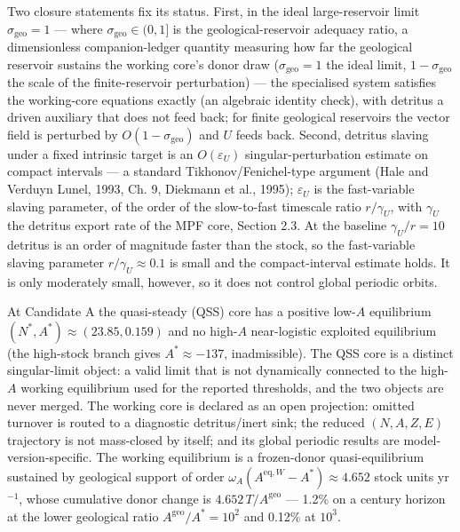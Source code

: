 \documentclass[11pt]{article}
\begin{document}
Two closure statements fix its status. First, in the ideal
large-reservoir limit \(\sigma_{\mathrm{geo}} = 1\) --- where
\(\sigma_{\mathrm{geo}} \in (0,1]\) is the geological-reservoir adequacy
ratio, a dimensionless companion-ledger quantity measuring how far the
geological reservoir sustains the working core's donor draw
(\(\sigma_{\mathrm{geo}} = 1\) the ideal limit,
\(1 - \sigma_{\mathrm{geo}}\) the scale of the finite-reservoir
perturbation) --- the specialised system satisfies the working-core
equations exactly (an algebraic identity check), with detritus a driven
auxiliary that does not feed back; for finite geological reservoirs the
vector field is perturbed by \(O(1 - \sigma_{\mathrm{geo}})\) and \(U\)
feeds back. Second, detritus slaving under a fixed intrinsic target is
an \(O(\varepsilon_U)\) singular-perturbation estimate on compact
intervals --- a standard Tikhonov/Fenichel-type argument (Hale and
Verduyn Lunel, 1993, Ch. 9, Diekmann et al., 1995); \(\varepsilon_U\) is
the fast-variable slaving parameter, of the order of the slow-to-fast
timescale ratio \(r/\gamma_U\), with \(\gamma_U\) the detritus export
rate of the MPF core, Section 2.3. At the baseline \(\gamma_U/r = 10\)
detritus is an order of magnitude faster than the stock, so the
fast-variable slaving parameter \(r/\gamma_U \approx 0.1\) is small and
the compact-interval estimate holds. It is only moderately small,
however, so it does not control global periodic orbits.

At Candidate A the quasi-steady (QSS) core has a positive low-\(A\)
equilibrium \((N^*, A^*) \approx (23.85, 0.159)\) and no high-\(A\)
near-logistic exploited equilibrium (the high-stock branch gives
\(A^* \approx -137\), inadmissible). The QSS core is a distinct
singular-limit object: a valid limit that is not dynamically connected
to the high-\(A\) working equilibrium used for the reported thresholds,
and the two objects are never merged. The working core is declared as an
open projection: omitted turnover is routed to a diagnostic
detritus/inert sink; the reduced \((N,A,Z,E)\) trajectory is not
mass-closed by itself; and its global periodic results are
model-version-specific. The working equilibrium is a frozen-donor
quasi-equilibrium sustained by geological support of order
\(\omega_A(A^{\mathrm{eq},W} - A^*) \approx 4.652\) stock units
yr\(^{-1}\), whose cumulative donor change is
\(4.652\,T/A^{\mathrm{geo}}\) --- 1.2\% on a century horizon at the
lower geological ratio \(A^{\mathrm{geo}}/A^* = 10^2\) and 0.12\% at
\(10^3\).
\end{document}
